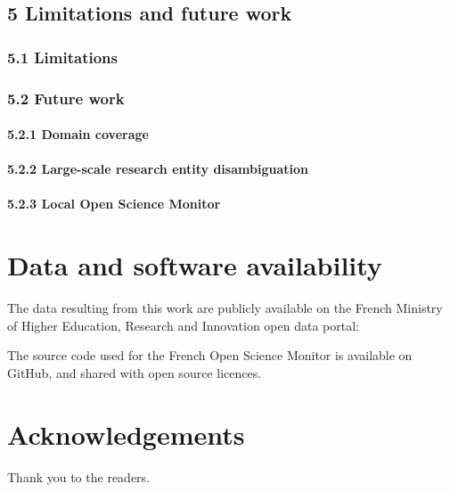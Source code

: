 \documentclass[
]{article}
\begin{document}
\hypertarget{limitations-and-future-work}{%
\subsection{5 Limitations and future
work}\label{limitations-and-future-work}}

\hypertarget{limitations}{%
\subsubsection{5.1 Limitations}\label{limitations}}

\hypertarget{future-work}{%
\subsubsection{5.2 Future work}\label{future-work}}

\hypertarget{domain-coverage}{%
\paragraph{5.2.1 Domain coverage}\label{domain-coverage}}

\hypertarget{large-scale-research-entity-disambiguation}{%
\paragraph{5.2.2 Large-scale research entity
disambiguation}\label{large-scale-research-entity-disambiguation}}

\hypertarget{local-open-science-monitor}{%
\paragraph{5.2.3 Local Open Science
Monitor}\label{local-open-science-monitor}}

\hypertarget{data-and-software-availability}{%
\section{Data and software
availability}\label{data-and-software-availability}}

The data resulting from this work are publicly available on the French
Ministry of Higher Education, Research and Innovation open data portal:

The source code used for the French Open Science Monitor is available on
GitHub, and shared with open source licences.

\hypertarget{acknowledgements}{%
\section{Acknowledgements}\label{acknowledgements}}

Thank you to the readers.
\end{document}
